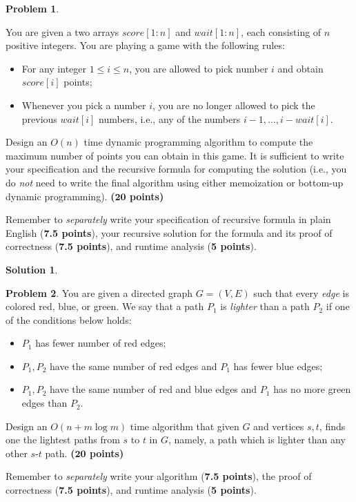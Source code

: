 \documentclass{article}
\theoremstyle{definition}
\newtheorem{problem}{Problem}
\newtheorem*{solution*}{Solution}
\newenvironment{solution}{\begin{solution*}}{{} \end{solution*}}
\newcommand{\grade}[1]{\hfill{\textbf{($\mathbf{#1}$ points)}}}
\begin{document}
\newpage

\newpage


\begin{problem}\label{old}

You are given a two arrays $score[1:n]$ and $wait[1:n]$, each consisting of $n$ positive integers. You are playing  a game with the following rules: 
\begin{itemize}
	\item For any integer $1 \leq i \leq n$, you are allowed to pick number $i$ and obtain $score[i]$ points; 
	\item Whenever you pick a number $i$, you are no longer allowed to pick the previous $wait[i]$ numbers, i.e., any of the numbers $i-1,\ldots,i-wait[i]$. 
\end{itemize}
Design an $O(n)$ time dynamic programming algorithm to compute the maximum number of points you can obtain in this game. It is sufficient to write your specification and the recursive formula for computing the solution (i.e., you do \emph{not} need to write the final algorithm using either memoization or bottom-up dynamic programming). \grade{20} 

\medskip

Remember to \emph{separately} write your specification of recursive formula in plain English (\textbf{7.5 points}), your recursive solution for the formula and its proof of correctness (\textbf{7.5 points}), and runtime analysis (\textbf{5 points}). 


\end{problem} 

\medskip
		\begin{solution}
		\end{solution}
		
\newpage

\begin{problem}\label{shortestpath}
You are given a directed graph $G=(V,E)$ such that every \emph{edge} is colored red, blue, or green. 
We say that a path $P_1$ is \emph{lighter} than a path $P_2$ if one of the conditions below holds:  
\begin{itemize}
\item $P_1$ has fewer number of red edges; 
\item $P_1,P_2$ have the same number of red edges and $P_1$ has fewer blue edges; 
\item $P_1,P_2$ have the same number of red and blue edges and $P_1$ has no more green edges than $P_2$. 
\end{itemize}

Design an $O(n+m\log{m})$ time algorithm that given $G$ and vertices $s,t$, finds one the lightest paths from $s$ to $t$ in $G$, namely, a path which is lighter than any other $s$-$t$ path. 
\grade{20}

\medskip

Remember to \emph{separately} write your algorithm (\textbf{7.5 points}), the proof of correctness (\textbf{7.5 points}), and runtime analysis (\textbf{5 points}). 


\end{problem}
\end{document}
